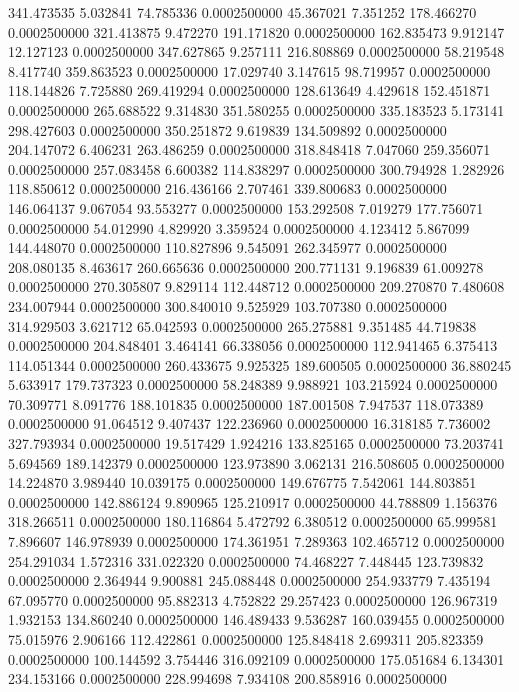 341.473535 5.032841 74.785336 0.0002500000
45.367021 7.351252 178.466270 0.0002500000
321.413875 9.472270 191.171820 0.0002500000
162.835473 9.912147 12.127123 0.0002500000
347.627865 9.257111 216.808869 0.0002500000
58.219548 8.417740 359.863523 0.0002500000
17.029740 3.147615 98.719957 0.0002500000
118.144826 7.725880 269.419294 0.0002500000
128.613649 4.429618 152.451871 0.0002500000
265.688522 9.314830 351.580255 0.0002500000
335.183523 5.173141 298.427603 0.0002500000
350.251872 9.619839 134.509892 0.0002500000
204.147072 6.406231 263.486259 0.0002500000
318.848418 7.047060 259.356071 0.0002500000
257.083458 6.600382 114.838297 0.0002500000
300.794928 1.282926 118.850612 0.0002500000
216.436166 2.707461 339.800683 0.0002500000
146.064137 9.067054 93.553277 0.0002500000
153.292508 7.019279 177.756071 0.0002500000
54.012990 4.829920 3.359524 0.0002500000
4.123412 5.867099 144.448070 0.0002500000
110.827896 9.545091 262.345977 0.0002500000
208.080135 8.463617 260.665636 0.0002500000
200.771131 9.196839 61.009278 0.0002500000
270.305807 9.829114 112.448712 0.0002500000
209.270870 7.480608 234.007944 0.0002500000
300.840010 9.525929 103.707380 0.0002500000
314.929503 3.621712 65.042593 0.0002500000
265.275881 9.351485 44.719838 0.0002500000
204.848401 3.464141 66.338056 0.0002500000
112.941465 6.375413 114.051344 0.0002500000
260.433675 9.925325 189.600505 0.0002500000
36.880245 5.633917 179.737323 0.0002500000
58.248389 9.988921 103.215924 0.0002500000
70.309771 8.091776 188.101835 0.0002500000
187.001508 7.947537 118.073389 0.0002500000
91.064512 9.407437 122.236960 0.0002500000
16.318185 7.736002 327.793934 0.0002500000
19.517429 1.924216 133.825165 0.0002500000
73.203741 5.694569 189.142379 0.0002500000
123.973890 3.062131 216.508605 0.0002500000
14.224870 3.989440 10.039175 0.0002500000
149.676775 7.542061 144.803851 0.0002500000
142.886124 9.890965 125.210917 0.0002500000
44.788809 1.156376 318.266511 0.0002500000
180.116864 5.472792 6.380512 0.0002500000
65.999581 7.896607 146.978939 0.0002500000
174.361951 7.289363 102.465712 0.0002500000
254.291034 1.572316 331.022320 0.0002500000
74.468227 7.448445 123.739832 0.0002500000
2.364944 9.900881 245.088448 0.0002500000
254.933779 7.435194 67.095770 0.0002500000
95.882313 4.752822 29.257423 0.0002500000
126.967319 1.932153 134.860240 0.0002500000
146.489433 9.536287 160.039455 0.0002500000
75.015976 2.906166 112.422861 0.0002500000
125.848418 2.699311 205.823359 0.0002500000
100.144592 3.754446 316.092109 0.0002500000
175.051684 6.134301 234.153166 0.0002500000
228.994698 7.934108 200.858916 0.0002500000
